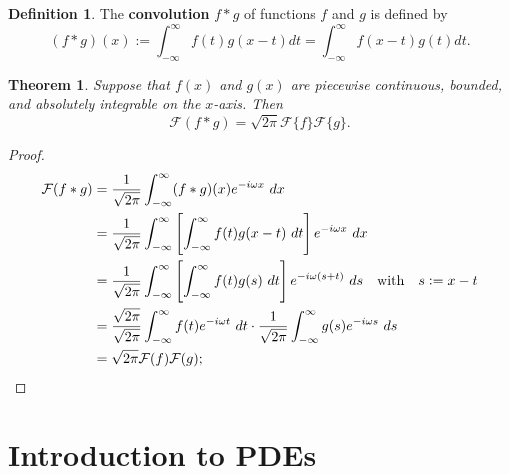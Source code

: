 \documentclass[12pt,openany]{book}
\newtheorem{theorem}{Theorem}[chapter]
\theoremstyle{definition}
\newtheorem{definition}{Definition}[chapter]
\begin{document}
	\vspace{12pt}
	\begin{tcolorbox}[colframe=defcolor, title={\color{white}\bf Convolution}]
		\begin{definition}
			The \textbf{convolution} \( f * g \) of functions \( f \) and \( g \) is defined by
			\[
			(f * g)(x) := \int_{-\infty}^{\infty} f(t)g(x - t) dt = \int_{-\infty}^{\infty} f(x - t)g(t) dt.
			\]
		\end{definition}
	\end{tcolorbox}
	\vspace{12pt}
	\begin{tcolorbox}[colframe=thmcolor, title={\color{white}\bf Convolution Theorem}]
		\begin{theorem}
			Suppose that \( f(x) \) and \( g(x) \) are piecewise continuous, bounded, and absolutely integrable on the \( x \)-axis. Then
			\[
			\mathcal{F}(f * g) = \sqrt{2\pi}\mathcal{F}\{f\}\mathcal{F}\{g\}.
			\]
		\end{theorem}
	\end{tcolorbox}
	\begin{proof}
		\begin{align*}
			\mathcal{F}(f*g)&=\frac{1}{\sqrt{2\pi}}\int_{-\infty}^{\infty}(f*g)(x)e^{-i\omega x}\ dx\\
			&=\frac{1}{\sqrt{2\pi}}\int_{-\infty}^{\infty}\sbr{\int_{-\infty}^{\infty} f(t)g(x - t)\ dt}e^{-i\omega x}\ dx\\
			&=\frac{1}{\sqrt{2\pi}}\int_{-\infty}^{\infty}\sbr{\int_{-\infty}^{\infty} f(t)g(s)\ dt}e^{-i\omega (s+t)}\ ds\quad\text{with}\quad s:=x-t\\
			&=\frac{\sqrt{2\pi}}{\sqrt{2\pi}}\int_{-\infty}^{\infty}f(t)e^{-i\omega t}\ dt\cdot\frac{1}{\sqrt{2\pi}}\int_{-\infty}^{\infty}g(s)e^{-i\omega s}\ ds\\
			&=\sqrt{2\pi}\mathcal{F}(f)\mathcal{F}(g);
		\end{align*}
	\end{proof}

	\newpage
	\chapter{Introduction to PDEs}
\end{document}
